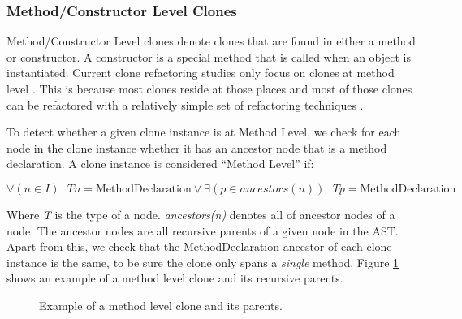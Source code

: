 \subsubsection{Method/Constructor Level Clones} \label{sec:methodlevelcr}
Method/Constructor Level clones denote clones that are found in either a method or constructor. A constructor is a special method that is called when an object is instantiated. Current clone refactoring studies only focus on clones at method level \cite{choi2011extracting, yue2018automatic, kodhai2013method, arcelli2013software, lin2014clonepedia, mandal2014automatic, balazinska2000advanced, yongting2018detection, bouktif2006novel, fanqi2014using, devi2016study}. This is because most clones reside at those places \cite{lozano2007evaluating, fontana2015duplicated} and most of those clones can be refactored with a relatively simple set of refactoring techniques \cite{kodhai2013method, fontana2015duplicated}.

To detect whether a given clone instance is at Method Level, we check for each node in the clone instance whether it has an ancestor node that is a method declaration. A clone instance is considered ``Method Level'' if:

\begin{equation}\label{eq:samemethod}
\forall (n \in I)\text{ } Tn = \text{MethodDeclaration} \lor \exists (p \in ancestors(n)) \text{ } Tp = \text{MethodDeclaration}
\end{equation}

Where \textit{T} is the type of a node. \textit{ancestors(n)} denotes all of ancestor nodes of a node. The ancestor nodes are all recursive parents of a given node in the AST. Apart from this, we check that the MethodDeclaration ancestor of each clone instance is the same, to be sure the clone only spans a \textit{single} method. Figure \ref{fig:methodlevelclone} shows an example of a method level clone and its recursive parents.

\begin{figure}[H]
\begin{parcolumns}{2}
\end{parcolumns}
\caption{Example of a method level clone and its parents.}
\label{fig:methodlevelclone}
\end{figure}

